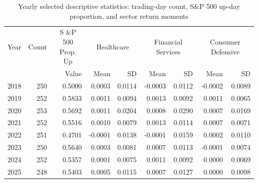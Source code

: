 \begin{table}[htbp]
\centering
\begin{tabular}{lrr|rr|rr|rr}
\hline
Year & Count & \multicolumn{1}{c|}{S \&P 500 Prop. Up} & \multicolumn{2}{c|}{Healthcare} & \multicolumn{2}{c|}{Financial Services} & \multicolumn{2}{c}{Consumer Defensive} \\
 &  & Value & Mean & SD & Mean & SD & Mean & SD \\
\hline
2018 & 250 & 0.5000 & 0.0003 & 0.0114 & -0.0003 & 0.0112 & -0.0002 & 0.0089 \\
2019 & 252 & 0.5833 & 0.0011 & 0.0094 & 0.0013 & 0.0092 & 0.0011 & 0.0065 \\
2020 & 253 & 0.5692 & 0.0011 & 0.0204 & 0.0008 & 0.0290 & 0.0007 & 0.0169 \\
2021 & 252 & 0.5516 & 0.0010 & 0.0079 & 0.0013 & 0.0114 & 0.0007 & 0.0071 \\
2022 & 251 & 0.4701 & -0.0001 & 0.0138 & -0.0001 & 0.0159 & 0.0002 & 0.0110 \\
2023 & 250 & 0.5640 & 0.0003 & 0.0081 & 0.0007 & 0.0113 & -0.0001 & 0.0074 \\
2024 & 252 & 0.5357 & 0.0001 & 0.0075 & 0.0011 & 0.0092 & 0.0000 & 0.0069 \\
2025 & 248 & 0.5403 & 0.0005 & 0.0115 & 0.0007 & 0.0127 & 0.0000 & 0.0098 \\
\hline
\end{tabular}
\caption{Yearly selected descriptive statistics: trading-day count, S\&P 500 up-day proportion, and sector return moments}
\label{tab:descriptive_stats}
\end{table}

